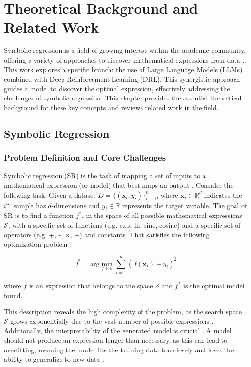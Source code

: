 \chapter{Theoretical Background and Related Work}
Symbolic regression is a field of growing interest within the academic community, offering a variety of approaches to discover mathematical expressions from data \cite{dong2025RecentAdvances}. This work explores a specific branch: the use of Large Language Models (LLMs) combined with Deep Reinforcement Learning (DRL). This synergistic approach guides a model to discover the optimal expression, effectively addressing the challenges of symbolic regression. This chapter provides the essential theoretical background for these key concepts and reviews related work in the field.

\section{Symbolic Regression}

\subsection{Problem Definition and Core Challenges}
Symbolic regression (SR) is the task of mapping a set of inputs to a mathematical expression (or model) that best maps an output \cite{lample2019deep, petersen2020deep}. Consider the following task. Given a dataset \(D = \{(\mathbf{x}_i, y_i)\}_{i=1}^{n}\), where \(\mathbf{x}_i \in \mathbb{R}^d\) indicates the \(i^{th}\) sample has \(d\)-dimensions and \(y_i \in \mathbb{R}\) represents the target variable. The goal of SR is to find a function \(f^*\), in the space of all possible mathematical expressions \(\mathcal{S}\), with a specific set of functions (e.g. exp, ln, sine, cosine) and a specific set of operators (e.g. +, -, \(\times\), \(\div\)) and constants. That satisfies the following optimization problem \cite{lample2019deep}:

\begin{equation}
f^* = \mathrm{arg} \min_{f \in \mathcal{S}} \sum_{i=1}^n (f(\mathbf{x}_i) - y_i)^2
\end{equation}

where \(f\) is an expression that belongs to the space \(\mathcal{S}\) and \(f^*\) is the optimal model found.

This description reveals the high complexity of the problem, as the search space \(\mathcal{S}\) grows exponentially due to the vast number of possible expressions \cite{petersen2020deep}. Additionally, the interpretability of the generated model is crucial \cite{Rudin2019Stop}. A model should not produce an expression longer than necessary, as this can lead to overfitting, meaning the model fits the training data too closely and loses the ability to generalize to new data \cite{wilstrup2021symbolic}.

